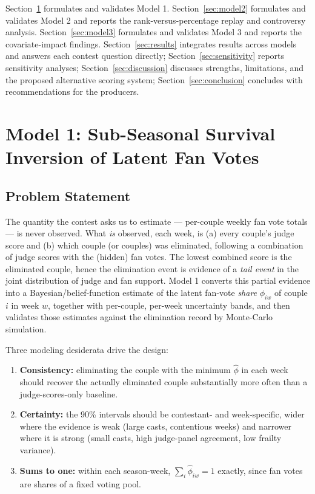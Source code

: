 \documentclass[10pt]{article}
\begin{document}
Section~\ref{sec:model1} formulates and validates Model 1. Section~\ref{sec:model2}
formulates and validates Model 2 and reports the rank-versus-percentage replay and
controversy analysis. Section~\ref{sec:model3} formulates and validates Model 3 and
reports the covariate-impact findings. Section~\ref{sec:results} integrates results across
models and answers each contest question directly; Section~\ref{sec:sensitivity} reports
sensitivity analyses; Section~\ref{sec:discussion} discusses strengths, limitations, and
the proposed alternative scoring system; Section~\ref{sec:conclusion} concludes with
recommendations for the producers.

\section{Model 1: Sub-Seasonal Survival Inversion of Latent Fan Votes}
\label{sec:model1}

\subsection{Problem Statement}

The quantity the contest asks us to estimate --- per-couple weekly fan vote totals ---
is never observed. What \emph{is} observed, each week, is (a) every couple's judge score
and (b) which couple (or couples) was eliminated, following a combination of judge scores
with the (hidden) fan votes. The lowest combined score is the eliminated couple, hence the
elimination event is evidence of a \emph{tail event} in the joint distribution of judge
and fan support. Model 1 converts this partial evidence into a Bayesian/belief-function
estimate of the latent fan-vote \emph{share} $\phi_{iw}$ of couple $i$ in week $w$,
together with per-couple, per-week uncertainty bands, and then validates those estimates
against the elimination record by Monte-Carlo simulation.

Three modeling desiderata drive the design:
\begin{enumerate}[itemsep=1pt]
\item \textbf{Consistency:} eliminating the couple with the minimum $\hat\phi$ in each
week should recover the actually eliminated couple substantially more often than a
judge-scores-only baseline.
\item \textbf{Certainty:} the 90\% intervals should be contestant- and week-specific,
wider where the evidence is weak (large casts, contentious weeks) and narrower where it is
strong (small casts, high judge-panel agreement, low frailty variance).
\item \textbf{Sums to one:} within each season-week, $\sum_i \hat\phi_{iw} = 1$ exactly,
since fan votes are shares of a fixed voting pool.
\end{enumerate}
\end{document}
